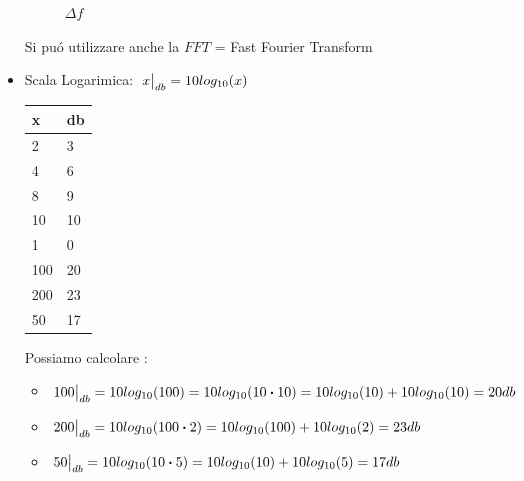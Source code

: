 \begin{itemize}
{\begin{figure}[H]
                    \caption{ $\Delta f$}
                    \label{fig:campionamento MATLAB sinc}
                \end{figure}
                Si puó utilizzare anche la $FFT$ = Fast Fourier Transform
            }
            \item{
                Scala Logarimica: $\eval*{x}_{db}= 10log_{10}(x)$
                \begin{table}[H]
                    \centering
                    \begin{tabular}{l|l}
                        x   & db  \\ 
                        \hline
                        2   & 3   \\
                        4   & 6   \\
                        8   & 9   \\
                        10  & 10  \\
                        1   & 0   \\
                        100 & 20  \\
                        200 & 23  \\
                        50  & 17 
                    \end{tabular}
                \end{table}
                Possiamo calcolare :
                \begin{itemize}
                    \item $\eval*{100}_{db} = 10log_{10}(100) =10log_{10}(10\dotproduct 10) = 10log_{10}(10)+10log_{10}(10) = 20db $
                    \item $\eval*{200}_{db} = 10log_{10}(100\dotproduct 2) = 10log_{10}(100)+10log_{10}(2) = 23db $
                    \item $\eval*{50}_{db} = 10log_{10}(10\dotproduct 5) = 10log_{10}(10)+10log_{10}(5) = 17db $
                \end{itemize}
            }
        \end{itemize}

    
